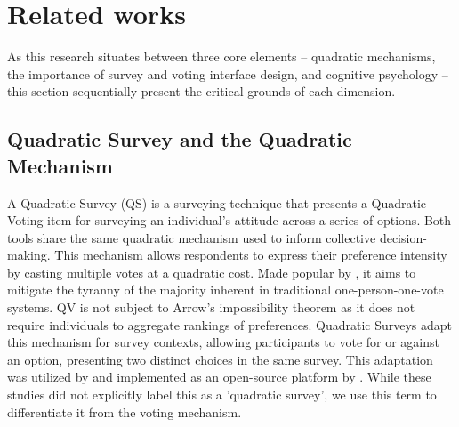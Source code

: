 \section{Related works}
\label{sec:relatedWorks}
As this research situates between three core elements -- quadratic mechanisms, the importance of survey and voting interface design, and cognitive psychology -- this section sequentially present the critical grounds of each dimension.

\subsection{Quadratic Survey and the Quadratic Mechanism}
A Quadratic Survey (QS) is a surveying technique that presents a Quadratic Voting item for surveying an individual's attitude across a series of options. Both tools share the same quadratic mechanism used to inform collective decision-making. This mechanism allows respondents to express their preference intensity by casting multiple votes at a quadratic cost. Made popular by \textcite{posner2018radical, lalley2018quadratic}, it aims to mitigate the tyranny of the majority inherent in traditional one-person-one-vote systems. QV is not subject to Arrow's impossibility theorem as it does not require individuals to aggregate rankings of preferences.  Quadratic Surveys adapt this mechanism for survey contexts, allowing participants to vote for or against an option, presenting two distinct choices in the same survey. This adaptation was utilized by \textcite{quarfoot2017quadratic} and implemented as an open-source platform by \textcite{bassettiCivicbaseOpensourcePlatform2023}. While these studies did not explicitly label this as a 'quadratic survey', we use this term to differentiate it from the voting mechanism.

